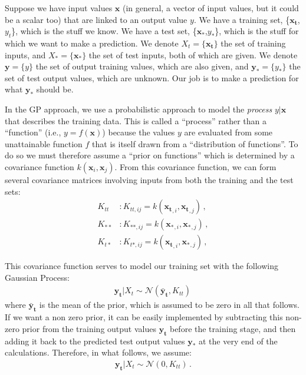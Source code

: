 \documentclass[11pt,a4paper]{article}
\numberwithin{equation}{section}
\begin{document}
Suppose we have input values $\mathbf{x}$ (in general, a vector of input values, but it could be a scalar too) that are linked to an output value $y$. We have a training set, \{$\mathbf{x_t}$,$y_t$\}, which is the stuff we know. We have a test set, \{$\mathbf{x_*}$,$y_*$\}, which is the stuff for which we want to make a prediction. We denote $X_t = \{\mathbf{x_t}\}$ the set of training inputs, and $X_* = \{\mathbf{x_*}\}$ the set of test inputs, both of which are given. We denote $\mathbf{y} = \{y\}$ the set of output training values, which are also given, and $\mathbf{y_*} = \{y_*\}$ the set of test output values, which are unknown. Our job is to make a prediction for what $\mathbf{y_*}$ should be.

In the GP approach, we use a probabilistic approach to model the \emph{process} $y|\mathbf{x}$ that describes the training data. This is called a ``process'' rather than a ``function'' (i.e., $y = f(\mathbf{x})$) because the values $y$ are evaluated from some unattainable function $f$ that is itself drawn from a ``distribution of functions''. To do so we must therefore assume a ``prior on functions'' which is determined by a covariance function $k(\mathbf{x}_i, \mathbf{x}_j)$. From this covariance function, we can form several covariance matrices involving inputs from both the training and the test sets:
\begin{align}
K_{tt} &: K_{tt,ij} = k(\mathbf{x_t}_{,i},\mathbf{x_t}_{,j})\,, \\
K_{**} &: K_{**,ij} = k(\mathbf{x_*}_{,i},\mathbf{x_*}_{,j})\,, \\
K_{t*} &: K_{t*,ij} = k(\mathbf{x_t}_{,i},\mathbf{x_*}_{,j})\,,
\end{align}

This covariance function serves to model our training set with the following Gaussian Process:
\begin{align}
\mathbf{y_t} | X_t \sim \mathcal{N}(\mathbf{\bar{y}_t},K_{tt})\,
\end{align}
where $\mathbf{\bar{y}_t}$ is the mean of the prior, which is assumed to be zero in all that follows. If we want a non zero prior, it can be easily implemented by subtracting this non-zero prior from the training output values $\mathbf{y_t}$ before the training stage, and then adding it back to the predicted test output values $\mathbf{y_*}$ at the very end of the calculations. Therefore, in what follows, we assume:
\begin{align}
\mathbf{y_t} | X_t \sim \mathcal{N}(0,K_{tt})\,. \label{EQ:std_prior}
\end{align}
\end{document}
